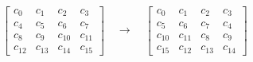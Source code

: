 \noindent
\flushleft
\(
\begin{bmatrix}
c_0  & c_1  & c_2  & c_3  \\
c_4  & c_5  & c_6  & c_7  \\
c_8  & c_9  & c_{10} & c_{11} \\
c_{12} & c_{13} & c_{14} & c_{15}
\end{bmatrix}
\quad \rightarrow \quad
\begin{bmatrix}
c_0  & c_1  & c_2  & c_3  \\
c_5  & c_6  & c_7  & c_4  \\
c_{10} & c_{11} & c_8  & c_9  \\
c_{15} & c_{12} & c_{13} & c_{14}
\end{bmatrix}
\)
\flushleft


